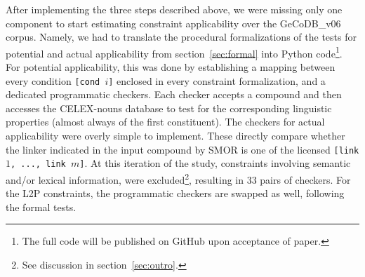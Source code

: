 \documentclass[10pt, a4paper]{article}
\newcommand{\zeroLinker}{\ensuremath{\boldsymbol{\varnothing}}}
\begin{document}
After implementing the three steps described above, we were missing only one component to start estimating constraint applicability over the GeCoDB\_v06 corpus. Namely, we had to translate the procedural formalizations of the tests for potential and actual applicability from section~\ref{sec:formal} into Python code\footnote{The full code will be published on GitHub upon acceptance of paper.}. For potential applicability, this was done by establishing a mapping between every condition \mbox{\texttt{[cond $i$]}} enclosed in every constraint formalization, and a dedicated programmatic checkers. Each checker accepts a compound and then accesses the CELEX-nouns database to test for the corresponding linguistic properties (almost always of the first constituent). The checkers for actual applicability were overly simple to implement. These directly compare whether the linker indicated in the input compound by SMOR is one of the licensed \mbox{\texttt{[link $1$, ..., link $m$]}}. At this iteration of the study, constraints involving semantic and/or lexical information, were excluded\footnote{See discussion in section~\ref{sec:outro}.}, resulting in 33 pairs of checkers. For the L2P constraints, the programmatic checkers are swapped as well, following the formal tests.

\end{document}
